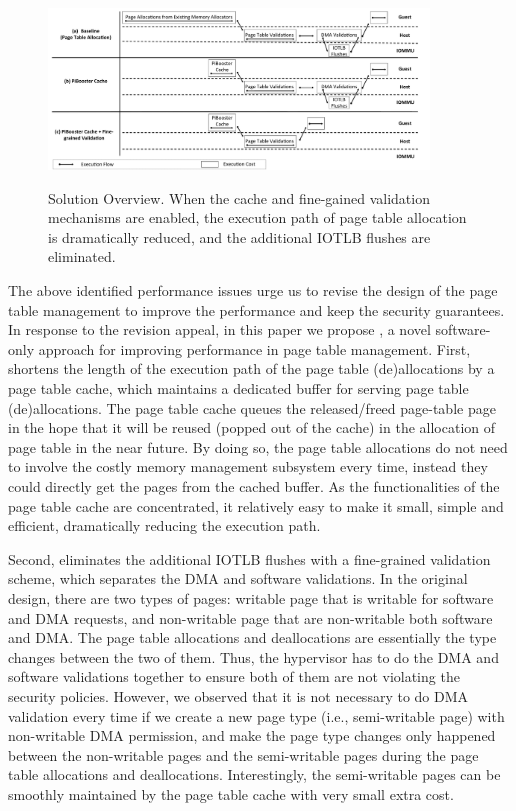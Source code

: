 \begin{figure}[ht]
\centering
\includegraphics[width=0.9\textwidth]{image/overview/overview.pdf} \\
\caption{Solution Overview. When the \name cache and fine-gained validation mechanisms are enabled, 
the execution path of page table allocation is dramatically reduced, and the additional IOTLB flushes are eliminated.}
\label{fig:overview}
\end{figure}

The above identified performance issues urge us to revise the design of the page table management to improve the performance and keep the security guarantees. 
In response to the revision appeal, in this paper we propose \name, a novel software-only approach for improving performance in page table management. 
First, \name shortens the length of the execution path of the page table (de)allocations by a page table cache, which maintains a dedicated buffer for serving page table (de)allocations.
The page table cache queues the released/freed page-table page in the hope that 
it will be reused (popped out of the cache) in the allocation of page table in the near future.
By doing so, the page table allocations do not need to involve the costly memory management subsystem every time, instead they could directly get the pages from the cached buffer.
As the functionalities of the page table cache are concentrated, it relatively easy to make it small, simple and efficient, dramatically reducing the execution path.

Second, \name eliminates the additional IOTLB flushes with a fine-grained validation scheme, which separates the DMA and software validations.
In the original design, there are two types of pages: writable page that is writable for software and DMA requests, and non-writable page that are non-writable both software and DMA.
The page table allocations and deallocations are essentially the type changes between the two of them.
Thus, the hypervisor has to do the DMA and software validations together to ensure both of them are not violating the security policies.
However, we observed that it is not necessary to do DMA validation every time if we create a new page type (i.e., semi-writable page) with non-writable DMA permission, and make the page type changes only happened between the non-writable pages and the semi-writable pages during the page table allocations and deallocations. 
Interestingly, the semi-writable pages can be smoothly maintained by the page table cache with very small extra cost.

